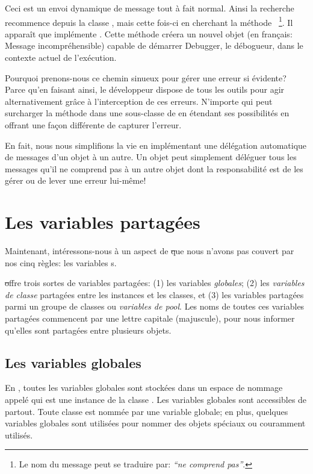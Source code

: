 \documentclass[a4paper,10pt,twoside]{book}
\begin{document}
Ceci est un envoi dynamique de message tout à fait normal. Ainsi
la recherche recommence depuis la classe , mais
cette fois-ci en cherchant la méthode ~\footnote{Le nom du message peut se traduire par: \emph{``ne comprend pas''}.}.
Il apparaît que  implémente .
Cette méthode créera un nouvel objet  (en français: Message incompréhensible) capable de démarrer Debugger, le débogueur, dans le contexte actuel de l'exécution.

Pourquoi prenons-nous ce chemin sinueux pour gérer une erreur si évidente?
Parce qu'en faisant ainsi, le développeur dispose de tous les outils pour
agir alternativement grâce à l'interception de ces erreurs.
N'importe qui peut surcharger la méthode  
dans une sous-classe de  en étendant ses possibilités en
offrant une façon différente de capturer l'erreur.

En fait, nous nous simplifions la vie en implémentant une 
délégation automatique de messages d'un objet à un autre.
Un objet  peut simplement déléguer tous les messages
qu'il ne comprend pas à un autre objet dont la responsabilité est de les gérer ou
de lever une erreur lui-même!

\section{Les variables partagées}

Maintenant, intéressons-nous à un aspect de \st que nous n'avons pas couvert
par nos cinq règles: les variables s.

\st offre trois sortes de variables partagées: (1) les variables \emph{globales}; (2) les \emph{variables de classe} partagées entre les instances et les classes, et (3) les variables partagées parmi un groupe de classes ou \emph{variables de pool}.  Les noms de toutes ces variables partagées commencent par une lettre capitale (majuscule), pour nous informer qu'elles sont partagées entre plusieurs objets.

\subsection{Les variables globales}
En \pharo, toutes les variables globales sont stockées dans un espace de nommage appelé  qui est une instance de la classe .
Les variables globales sont accessibles de partout.
Toute classe est nommée par une variable globale; en plus, quelques variables globales sont utilisées pour nommer des objets spéciaux ou couramment utilisés.  
\end{document}
